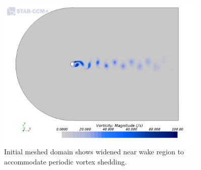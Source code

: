 \documentclass[10pt,english]{article}
\begin{document}
 \begin{figure}[h]
\centering
\includegraphics[trim={0.0cm 0cm 0.0cm 0cm},clip,width=0.9\textwidth]{cylinder_2_016_ScalarScene2.png}
\vspace{-5pt}
\caption{Initial meshed domain shows widened near wake region to accommodate periodic vortex shedding. }
\label{f:cylinder_2_016_ScalarScene2}
\end{figure}
\end{document}

